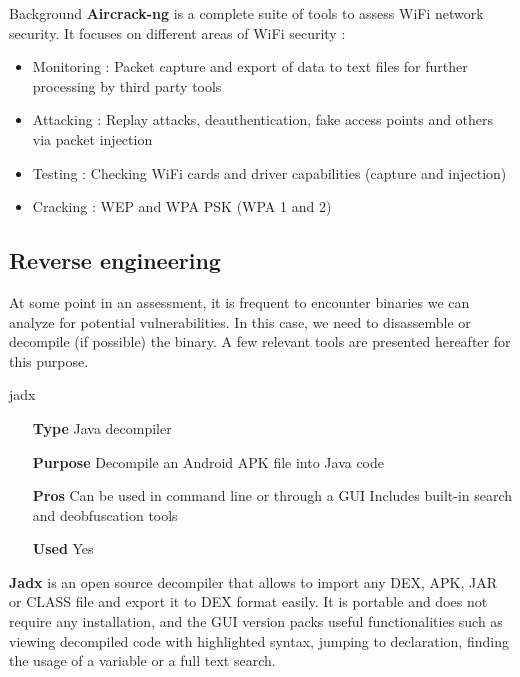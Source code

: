 \begin{chaptercover}{Background}
\textbf{Aircrack-ng} \cite{aircrack-ng} is a complete suite of tools to assess WiFi network security. It focuses on different areas of WiFi security :
\begin{itemize}[itemsep=0.05cm,topsep=0.05cm]
  \item Monitoring : Packet capture and export of data to text files for further processing by third party tools
  \item Attacking : Replay attacks, deauthentication, fake access points and others via packet injection
  \item Testing : Checking WiFi cards and driver capabilities (capture and injection)
  \item Cracking : WEP and WPA PSK (WPA 1 and 2)
\end{itemize}

\subsection{Reverse engineering}

At some point in an assessment, it is frequent to encounter binaries we can analyze for potential vulnerabilities. In this case, we need to disassemble or decompile (if possible) the binary. A few relevant tools are presented hereafter for this purpose.

\begin{solutiondata}{jadx}
\begin{itemize}[labelsep=1cm]
  \item [\textbf{Type}] Java decompiler
  \item [\textbf{Purpose}] Decompile an Android APK file into Java code
  \item [\textbf{Pros}] Can be used in command line or through a GUI \newline Includes built-in search and deobfuscation tools
  \item [\textbf{Used}] Yes
\end{itemize}
\end{solutiondata}

\textbf{Jadx} \cite{jadx} is an open source decompiler that allows to import any DEX, APK, JAR or CLASS file and export it to DEX format easily. It is portable and does not require any installation, and the GUI version packs useful functionalities such as viewing decompiled code with highlighted syntax, jumping to declaration, finding the usage of a variable or a full text search.


\end{chaptercover}
